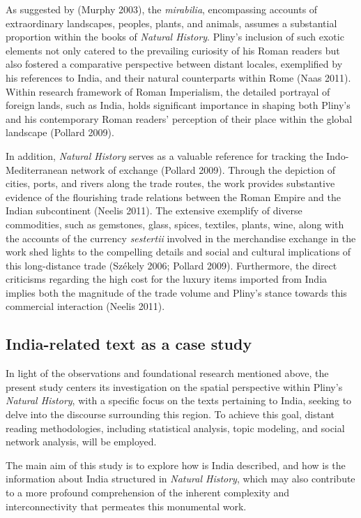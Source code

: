 \documentclass[
  12pt,
]{article}
\begin{document}
As suggested by (Murphy 2003), the \emph{mirabilia}, encompassing
accounts of extraordinary landscapes, peoples, plants, and animals,
assumes a substantial proportion within the books of \emph{Natural
History}. Pliny's inclusion of such exotic elements not only catered to
the prevailing curiosity of his Roman readers but also fostered a
comparative perspective between distant locales, exemplified by his
references to India, and their natural counterparts within Rome (Naas
2011). Within research framework of Roman Imperialism, the detailed
portrayal of foreign lands, such as India, holds significant importance
in shaping both Pliny's and his contemporary Roman readers' perception
of their place within the global landscape (Pollard 2009).

In addition, \emph{Natural History} serves as a valuable reference for
tracking the Indo-Mediterranean network of exchange (Pollard 2009).
Through the depiction of cities, ports, and rivers along the trade
routes, the work provides substantive evidence of the flourishing trade
relations between the Roman Empire and the Indian subcontinent (Neelis
2011). The extensive exemplify of diverse commodities, such as
gemstones, glass, spices, textiles, plants, wine, along with the
accounts of the currency \emph{sestertii} involved in the merchandise
exchange in the work shed lights to the compelling details and social
and cultural implications of this long-distance trade (Székely 2006;
Pollard 2009). Furthermore, the direct criticisms regarding the high
cost for the luxury items imported from India implies both the magnitude
of the trade volume and Pliny's stance towards this commercial
interaction (Neelis 2011).

\hypertarget{india-related-text-as-a-case-study}{%
\subsection{India-related text as a case
study}\label{india-related-text-as-a-case-study}}

In light of the observations and foundational research mentioned above,
the present study centers its investigation on the spatial perspective
within Pliny's \emph{Natural History}, with a specific focus on the
texts pertaining to India, seeking to delve into the discourse
surrounding this region. To achieve this goal, distant reading
methodologies, including statistical analysis, topic modeling, and
social network analysis, will be employed.

The main aim of this study is to explore how is India described, and how
is the information about India structured in \emph{Natural History},
which may also contribute to a more profound comprehension of the
inherent complexity and interconnectivity that permeates this monumental
work.
\end{document}
